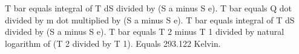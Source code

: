 T bar equals integral of T dS divided by (S a minus S e).  
T bar equals Q dot divided by m dot multiplied by (S a minus S e).  
T bar equals integral of T dS divided by (S a minus S e).  
T bar equals T 2 minus T 1 divided by natural logarithm of (T 2 divided by T 1).  
Equals 293.122 Kelvin.